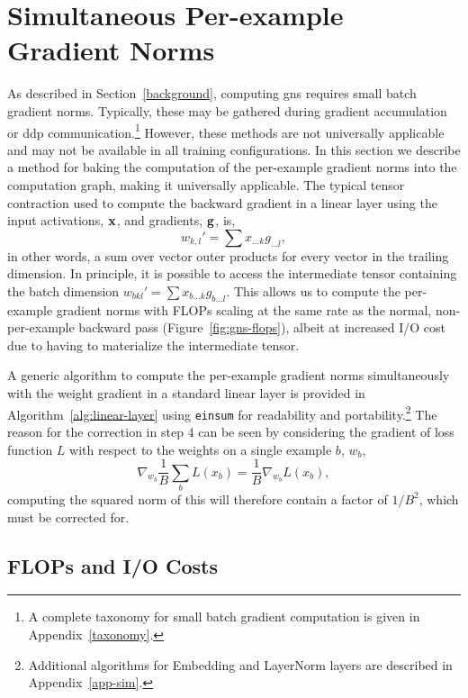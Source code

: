 \documentclass{article}
\begin{document}
\section{Simultaneous Per-example Gradient Norms}\label{sim-per-example}



As described in Section~\ref{background}, computing \ac{gns} requires small
batch gradient norms. Typically, these may be gathered during gradient
accumulation or \ac{ddp} communication.\footnote{A complete taxonomy for small batch gradient computation is given in Appendix~\ref{taxonomy}.}
However, these methods are not universally applicable and may not be available
in all training configurations. In this section we describe a method for baking
the computation of the per-example gradient norms into the computation graph,
making it universally applicable.
The typical tensor contraction used to compute the backward gradient in a linear layer using
the input activations, $\mathbf{x}$, and gradients, $\mathbf{g}$, is,
\[
    w_{k, l}' = \sum x_{\ldots k} g_{\ldots l},
\]
in other words, a sum over vector outer products for every vector in the
trailing dimension. In principle, it is possible to
access the intermediate tensor containing the batch dimension $w_{b k l}' = \sum
x_{b \ldots k} g_{b \ldots l}$. This allows us to compute the per-example gradient
norms with FLOPs scaling at the same rate as the normal, non-per-example backward pass (Figure~\ref{fig:gns-flops}), albeit
at increased I/O cost due to having to materialize the intermediate tensor.

A generic algorithm to compute the per-example gradient norms simultaneously
with the weight gradient in a standard linear layer is provided in
Algorithm~\ref{alg:linear-layer} using \texttt{einsum} for readability and
portability.\footnote{Additional algorithms for Embedding and
LayerNorm layers are described in Appendix~\ref{app-sim}.} The reason for the
correction in step 4 can be seen by considering the gradient of loss function
$L$ with respect to the weights on a single example $b$, $w_b$,
\[
    \nabla_{w_b} \frac{1}{B} \sum_b L(x_b) = \frac{1}{B} \nabla_{w_b} L(x_b),
\]
computing the squared norm of this will therefore contain a factor of $1/B^2$,
which must be corrected for.



\subsection{FLOPs and I/O Costs}\label{flops}
\end{document}
